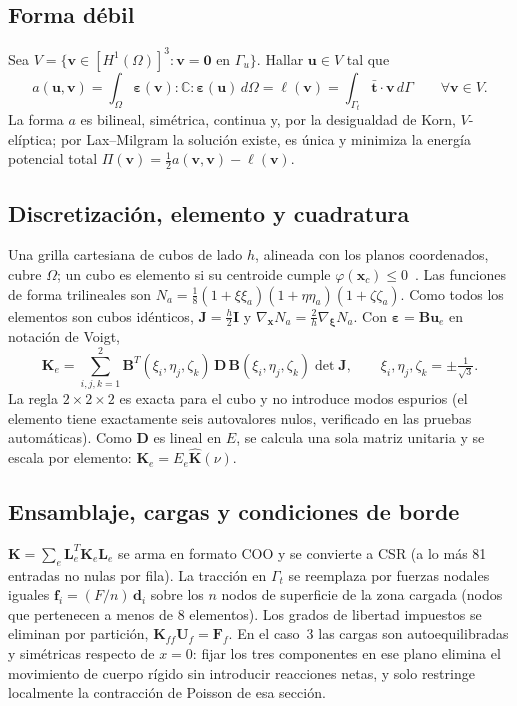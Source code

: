 \documentclass[11pt,a4paper]{article}
\begin{document}
\subsection{Forma débil}
Sea $V=\{\mathbf v\in[H^1(\Omega)]^3:\mathbf v=\mathbf 0 \text{ en }\Gamma_u\}$. Hallar $\mathbf u\in V$ tal que
\begin{equation}
a(\mathbf u,\mathbf v)=\int_\Omega \bm\varepsilon(\mathbf v):\mathbb C:\bm\varepsilon(\mathbf u)\,d\Omega
= \ell(\mathbf v)=\int_{\Gamma_t}\bar{\mathbf t}\cdot\mathbf v\,d\Gamma\qquad\forall\mathbf v\in V.
\end{equation}
La forma $a$ es bilineal, simétrica, continua y, por la desigualdad de Korn, $V$-elíptica; por Lax--Milgram la solución existe, es única y minimiza la energía potencial total $\Pi(\mathbf v)=\frac12a(\mathbf v,\mathbf v)-\ell(\mathbf v)$.

\subsection{Discretización, elemento y cuadratura}
Una grilla cartesiana de cubos de lado $h$, alineada con los planos coordenados, cubre $\Omega$; un cubo es elemento si su centroide cumple $\varphi(\mathbf x_c)\le0$~\cite{keyak1990,keyak1992}. Las funciones de forma trilineales son $N_a=\frac18(1+\xi\xi_a)(1+\eta\eta_a)(1+\zeta\zeta_a)$. Como todos los elementos son cubos idénticos, $\mathbf J=\frac h2\mathbf I$ y $\nabla_{\mathbf x}N_a=\frac2h\nabla_{\bm\xi}N_a$. Con $\bm\varepsilon=\mathbf B\mathbf u_e$ en notación de Voigt,
\begin{equation}
\mathbf K_e=\sum_{i,j,k=1}^{2}\mathbf B^T(\xi_i,\eta_j,\zeta_k)\,\mathbf D\,\mathbf B(\xi_i,\eta_j,\zeta_k)\det\mathbf J,\qquad \xi_i,\eta_j,\zeta_k=\pm\tfrac1{\sqrt3}.
\end{equation}
La regla $2\times2\times2$ es exacta para el cubo y no introduce modos espurios (el elemento tiene exactamente seis autovalores nulos, verificado en las pruebas automáticas). Como $\mathbf D$ es lineal en $E$, se calcula una sola matriz unitaria y se escala por elemento: $\mathbf K_e=E_e\hat{\mathbf K}(\nu)$.

\subsection{Ensamblaje, cargas y condiciones de borde}
$\mathbf K=\sum_e\mathbf L_e^T\mathbf K_e\mathbf L_e$ se arma en formato COO y se convierte a CSR (a lo más 81 entradas no nulas por fila). La tracción en $\Gamma_t$ se reemplaza por fuerzas nodales iguales $\mathbf f_i=(F/n)\,\mathbf d_i$ sobre los $n$ nodos de superficie de la zona cargada (nodos que pertenecen a menos de 8 elementos). Los grados de libertad impuestos se eliminan por partición, $\mathbf K_{ff}\mathbf U_f=\mathbf F_f$. En el caso~3 las cargas son autoequilibradas y simétricas respecto de $x=0$: fijar los tres componentes en ese plano elimina el movimiento de cuerpo rígido sin introducir reacciones netas, y solo restringe localmente la contracción de Poisson de esa sección.
\end{document}
